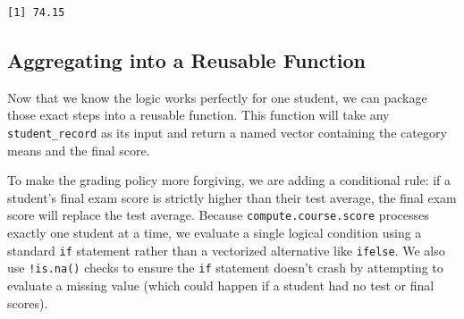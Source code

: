 \documentclass[
  letterpaper,
  DIV=11,
  numbers=noendperiod]{scrreprt}
\begin{document}
\begin{verbatim}
[1] 74.15
\end{verbatim}

\subsection{Aggregating into a Reusable
Function}\label{aggregating-into-a-reusable-function}

Now that we know the logic works perfectly for one student, we can
package those exact steps into a reusable function. This function will
take any \texttt{student\_record} as its input and return a named vector
containing the category means and the final score.

To make the grading policy more forgiving, we are adding a conditional
rule: if a student's final exam score is strictly higher than their test
average, the final exam score will replace the test average. Because
\texttt{compute.course.score} processes exactly one student at a time,
we evaluate a single logical condition using a standard \texttt{if}
statement rather than a vectorized alternative like \texttt{ifelse}. We
also use \texttt{!is.na()} checks to ensure the \texttt{if} statement
doesn't crash by attempting to evaluate a missing value (which could
happen if a student had no test or final scores).
\end{document}
